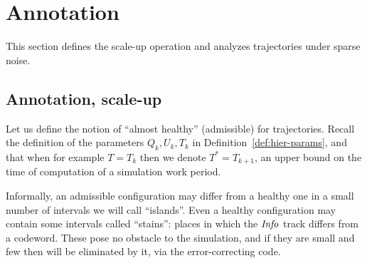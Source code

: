 \documentclass[11pt]{memoir}
\theoremstyle{definition} %
\newcommand{\fld}[1]{\ensuremath{\textit{#1\/}}}
\def\B{B}
\newcommand{\Noise}{\mathit{Noise}}
\newcommand{\Tu}{T}
\newcommand{\Tus}{T^{*}}
\newcommand{\Info}{\fld{Info}}
\begin{document}



\section{Annotation}    \label{sec:annotation}

This section defines the scale-up operation and analyzes trajectories under sparse noise.

\subsection{Annotation, scale-up}    \label{sec:annotation,scale-up}

Let us define the notion of ``almost healthy'' (admissible) for trajectories.
Recall the definition of the parameters \( Q_{k},U_{k},\Tu_{k} \) in Definition~\ref{def:hier-params},
and that when for example \( \Tu=\Tu_{k}\) then we denote \( \Tus = \Tu_{k+1} \),
an upper bound on the time of computation of a simulation work period.

Informally, an admissible configuration may differ from a healthy one in a small number
of intervals we will call ``islands''.
Even a healthy configuration may contain some intervals called ``stains'':
places in which the \( \Info \) track differs from a codeword.
These pose no obstacle to the simulation, and if they are small and few then
will be eliminated by it, via the error-correcting code.
\end{document}
